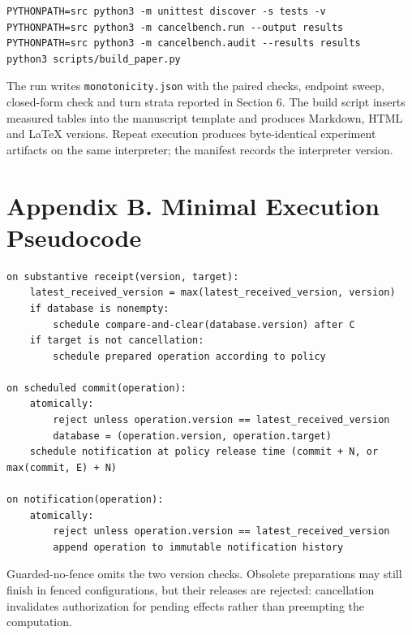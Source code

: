 \documentclass[11pt]{article}
\begin{document}
\begin{lstlisting}
PYTHONPATH=src python3 -m unittest discover -s tests -v
PYTHONPATH=src python3 -m cancelbench.run --output results
PYTHONPATH=src python3 -m cancelbench.audit --results results
python3 scripts/build_paper.py
\end{lstlisting}

The run writes \texttt{monotonicity.json} with the paired checks, endpoint sweep, closed-form check and turn strata reported in Section 6. The build script inserts measured tables into the manuscript template and produces Markdown, HTML and LaTeX versions. Repeat execution produces byte-identical experiment artifacts on the same interpreter; the manifest records the interpreter version.


\section*{Appendix B. Minimal Execution Pseudocode}

\begin{lstlisting}
on substantive receipt(version, target):
    latest_received_version = max(latest_received_version, version)
    if database is nonempty:
        schedule compare-and-clear(database.version) after C
    if target is not cancellation:
        schedule prepared operation according to policy

on scheduled commit(operation):
    atomically:
        reject unless operation.version == latest_received_version
        database = (operation.version, operation.target)
    schedule notification at policy release time (commit + N, or max(commit, E) + N)

on notification(operation):
    atomically:
        reject unless operation.version == latest_received_version
        append operation to immutable notification history
\end{lstlisting}

Guarded-no-fence omits the two version checks. Obsolete preparations may still finish in fenced configurations, but their releases are rejected: cancellation invalidates authorization for pending effects rather than preempting the computation.
\end{document}
